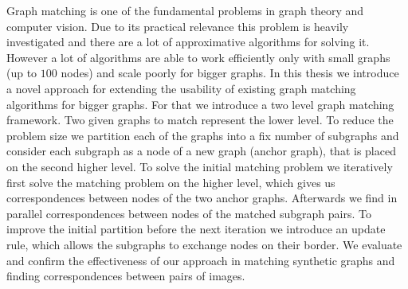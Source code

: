 Graph matching is one of the fundamental problems in graph theory and computer vision. Due to its practical relevance this problem is heavily investigated and there are a lot of approximative algorithms for solving it.
However a lot of algorithms are able to work efficiently only with small graphs (up to $100$ nodes) and scale poorly for bigger graphs. In this thesis we introduce a novel approach for extending the usability of existing graph matching algorithms for bigger graphs. For that we introduce a two level graph matching framework. Two given graphs to match represent the lower level. To reduce the problem size we partition each of the graphs into a fix number of subgraphs and consider each subgraph as a node of a new graph (anchor graph), that is placed on the second higher level. To solve the initial matching problem we iteratively first solve the matching problem on the higher level, which gives us correspondences between nodes of the two anchor graphs. Afterwards we find in parallel correspondences between nodes of the matched subgraph pairs. To improve the initial partition before the next iteration we introduce an update rule, which allows the subgraphs to exchange nodes on their border. We evaluate and confirm the effectiveness of our approach in matching synthetic graphs and finding correspondences between pairs of images.